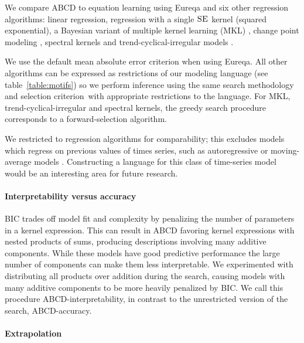 \documentclass[letterpaper]{article}
\newcommand{\procedurename}{ABCD}
\begin{document}
We compare \procedurename{} to equation learning using Eureqa \citep{Eureqa} and six other regression algorithms: linear regression, \gp{} regression with a single ${\textsc{SE}}$ kernel (squared exponential), a Bayesian variant of multiple kernel learning (MKL) \citep{bach2004multiple}, change point modeling
\citep{garnett2010sequential, FoxDunson:NIPS2012}, spectral kernels \citep{WilAda13} and trend-cyclical-irregular models \citep[e.g.][]{lind2006basic}.

We use the default mean absolute error criterion when using Eureqa.
All other algorithms can be expressed as restrictions of our modeling language (see table~\ref{table:motifs}) so we perform inference using the same search methodology and selection criterion\footnotemark~with appropriate restrictions to the language.
For MKL, trend-cyclical-irregular and spectral kernels, the greedy search procedure corresponds to a forward-selection algorithm. 

We restricted to regression algorithms for comparability; this excludes models which regress on previous values of times series, such as autoregressive or moving-average models \citep[e.g.][]{box2013time}.
Constructing a language for this class of time-series model would be an interesting area for future research.

\paragraph{Interpretability versus accuracy}

BIC trades off model fit and complexity by penalizing the number of parameters in a kernel expression.
This can result in \procedurename{} favoring kernel expressions with nested products of sums, producing descriptions involving many additive components.
While these models have good predictive performance the large number of components can make them less interpretable.
We experimented with distributing all products over addition during the search, causing models with many additive components to be more heavily penalized by BIC.
We call this procedure \procedurename{}-interpretability, in contrast to the unrestricted version of the search, \procedurename{}-accuracy.

\paragraph{Extrapolation}
\end{document}

